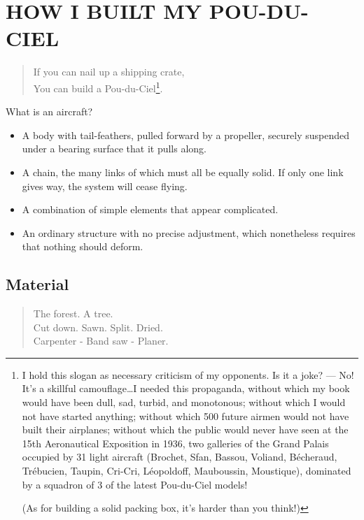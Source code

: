 \documentclass{book}
\begin{document}
\chapter{HOW I BUILT MY POU-DU-CIEL}

\begin{verse}
  { \selectfont If you can nail up a shipping
    crate,\\ You can build a Pou-du-Ciel\footnote{I hold this slogan
      as necessary criticism of my opponents. Is it a joke? --- No!
      It's a skillful camouflage\ldots I needed this propaganda,
      without which my book would have been dull, sad, turbid, and
      monotonous; without which I would not have started anything;
      without which 500 future airmen would not have built their
      airplanes; without which the public would never have seen at the
      15th Aeronautical Exposition in 1936, two galleries of the Grand
      Palais occupied by 31 light aircraft (Brochet, Sfan, Bassou,
      Voliand, B\'echeraud, Tr\'ebucien, Taupin, Cri-Cri,
      L\'eopoldoff, Mauboussin, Moustique), dominated by a squadron of
      3 of the latest Pou-du-Ciel models!
      
      (As for building a solid packing box, it's harder than you
      think!)}.
    
}
\end{verse}


What is an aircraft?

\begin{itemize}
\item
  A body with tail-feathers, pulled forward by a propeller, securely
  suspended under a bearing surface that it pulls along.
\item
  A chain, the many links of which must all be equally solid. If only
  one link gives way, the system will cease flying.
\item
  A combination of simple elements that appear complicated.
\item
  An ordinary structure with no precise adjustment, which nonetheless
  requires that nothing should deform.
\end{itemize}

\section{Material}

\begin{verse}
  The forest. A tree.\\
  Cut down. Sawn. Split. Dried.\\
  Carpenter - Band saw - Planer.
\end{verse}
\end{document}
